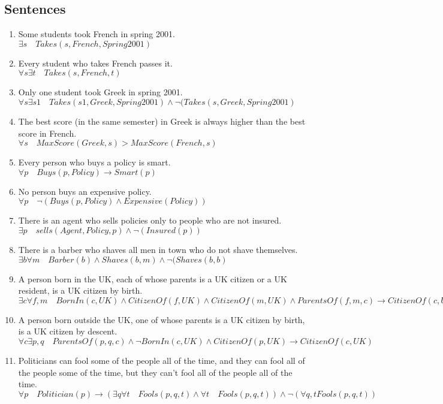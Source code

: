 \documentclass{scrartcl}
\begin{document}
\subsection{Sentences}
\begin{enumerate}[label={\alph*)}] 
	\item Some students took French in spring 2001.\\
	$\exists s\quad  Takes(s, French, Spring2001)$
	\item Every student who takes French passes it.\\
	$\forall s \exists t \quad Takes(s, French, t)$
	\item Only one student took Greek in spring 2001.\\
	$\forall s \exists s1 \quad Takes(s1, Greek, Spring2001) \land \neg(Takes(s, Greek, Spring2001)$
	\item The best score (in the same semester) in Greek is always higher than the best score in French.\\
	$\forall s \quad MaxScore(Greek, s) > MaxScore(French, s) $
	\item Every person who buys a policy is smart.\\
	$\forall p \quad Buys(p, Policy) \to Smart(p)$
	\item No person buys an expensive policy.\\
	$\forall p \quad \neg(Buys(p, Policy) \land Expensive(Policy))$
	\item There is an agent who sells policies only to people who are not insured.\\
	$\exists p \quad sells(Agent, Policy, p) \land \neg(Insured(p))$
	\item There is a barber who shaves all men in town who do not shave themselves.\\
	$\exists b \forall m \quad Barber(b)\land Shaves(b, m) \land \neg(Shaves(b, b)$
	
	\item A person born in the UK, each of whose parents is a UK citizen or a UK resident, is a UK citizen by birth.\\
	$\exists c \forall f, m \quad BornIn(c, UK) \land CitizenOf(f, UK) \land CitizenOf(m, UK) \land ParentsOf(f, m, c) \to CitizenOf(c, UK)$
	
	\item A person born outside the UK, one of whose parents is a UK citizen by birth, is a UK citizen by descent.\\
	$\forall c \exists p, q \quad ParentsOf(p, q, c) \land \neg BornIn(c, UK) \land CitizenOf(p, UK) \to CitizenOf(c, UK)$
	
	\item Politicians can fool some of the people all of the time, and they can fool all of the people some of the time, but they can’t fool all of the people all of the time.\\
	$\forall p \quad Politician(p)
	\to (\exists q \forall t \quad Fools(p, q, t)\land \forall t \quad Fools(p, q, t))\land\neg(\forall q, t Fools(p, q, t))$
	
\end{enumerate}
\end{document}
